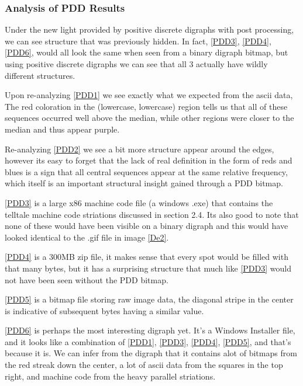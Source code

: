 \documentclass[12pt,a4paper]{article}
\begin{document}
\subsubsection{Analysis of PDD Results}
Under the new light provided by positive discrete digraphs with post processing, we can see structure 
that was previously hidden. In fact, \ref{PDD3}, \ref{PDD4}, \ref{PDD6}, would all look the same when seen from a binary digraph bitmap, but using positive discrete digraphs we can see that all 3 actually have wildly different structures. 

Upon re-analyzing \ref{PDD1} we see exactly what we expected from the ascii data, The red coloration in the (lowercase, lowercase) region tells us that all of these sequences occurred well above the median, while other regions were closer to the median and thus appear purple.

Re-analyzing \ref{PDD2} we see a bit more structure appear around the edges, however its easy to forget that the lack of real definition in the form of reds and blues is a sign that all central sequences appear at the same relative frequency, which itself is an important structural insight gained through  a PDD bitmap.

\ref{PDD3} is a large x86 machine code file (a windows .exe) that contains the telltale machine code striations discussed in section 2.4. Its also good to note that none of these would have been visible on a binary digraph and this would have looked identical to the .gif file in image \ref{De2}.

\ref{PDD4} is a 300MB zip file, it makes sense that every spot would be filled with that many bytes, but it has a surprising structure that much like \ref{PDD3} would not have been seen without the PDD bitmap.

\ref{PDD5} is a bitmap file storing raw image data, the diagonal stripe in the center is indicative of subsequent bytes having a similar value.

\ref{PDD6} is perhaps the most interesting digraph yet. It's a Windows Installer file, and it looks like a combination of \ref{PDD1}, \ref{PDD3}, \ref{PDD4}, \ref{PDD5}, and that's because it is. We can infer from the digraph that it contains alot of bitmaps from the red streak down the center, a lot of ascii data from the squares in the top right, and machine code from the heavy parallel striations. 
\end{document}
